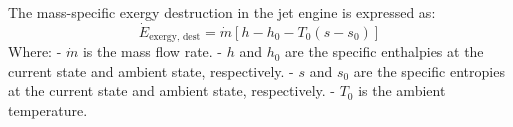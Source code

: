 The mass-specific exergy destruction in the jet engine is expressed as:  
\[
\dot{E}_{\text{exergy, dest}} = \dot{m} \left[ h - h_0 - T_0 (s - s_0) \right]
\]  
Where:  
- \( \dot{m} \) is the mass flow rate.  
- \( h \) and \( h_0 \) are the specific enthalpies at the current state and ambient state, respectively.  
- \( s \) and \( s_0 \) are the specific entropies at the current state and ambient state, respectively.  
- \( T_0 \) is the ambient temperature.